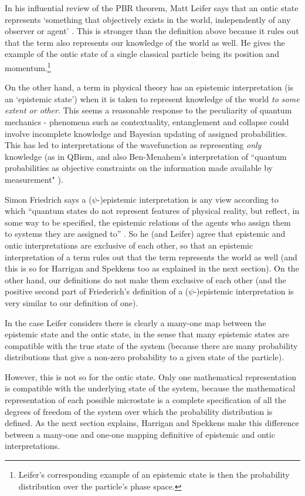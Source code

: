 \documentclass[superscriptaddress,reprint, floatfix, prl,nofootinbib]{revtex4-2}
\begin{document}
In his influential review of the PBR theorem, Matt Leifer says that an ontic state represents `something that objectively exists in the world, independently of any observer or agent' \cite{Leifer2014Review}. This is stronger than the definition above because it rules out that the term also represents our knowledge of the world as well. He gives the example of the ontic state of a single classical particle being its position and momentum.\footnote{Leifer's corresponding example of an epistemic state is then the probability distribution over the particle's phase space.}

On the other hand, a term in physical theory has an epistemic interpretation (is an `epistemic state') when it is taken to represent knowledge of the world \emph{to some extent or other}. This seems a reasonable response to the peculiarity of quantum mechanics - phenomena such as contextuality, entanglement and collapse could involve incomplete knowledge and Bayesian updating of assigned probabilities. This has led to interpretations of the wavefunction as representing \emph{only} knowledge (as in QBism, and also Ben-Menahem's interpretation of ``quantum probabilities as objective constraints on the information made available by measurement" \cite{Benmenahem2017PBR}).

Simon Friedrich says a ($\psi$-)epistemic interpretation is any view according to which ``quantum states do not represent features of physical reality, but reflect, in some way to be specified, the epistemic relations of the agents who assign them to systems they are assigned to'' \cite{friederich2014Interpreting}. So he (and Leifer) agree that epistemic and ontic interpretations are exclusive of each other, so that an epistemic interpretation of a term rules out that the term represents the world as well (and this is so for Harrigan and Spekkens too as explained in the next section). On the other hand, our definitions do not make them exclusive of each other (and the positive second part of Friederich's definition of a ($\psi$-)epistemic interpretation is very similar to our definition of one).

In the case Leifer considers there is clearly a many-one map between the epistemic state and the ontic state, in the sense that many epistemic states are compatible with the true state of the system (because there are many probability distributions that give a non-zero probability to a given state of the particle). 

However, this is not so for the ontic state. Only one mathematical representation is compatible with the underlying state of the system, because the mathematical representation of each possible microstate is a complete specification of all the degrees of freedom of the system over which the probability distribution is defined. As the next section explains, Harrigan and Spekkens make this difference between a many-one and one-one mapping definitive of epistemic and ontic interpretations.
\end{document}
